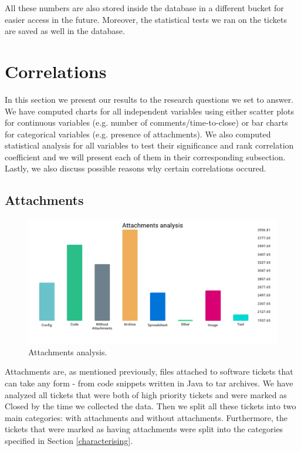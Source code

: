 \documentclass{mpaper}
\begin{document}
All these numbers are also stored inside the database in a different bucket for easier access in the future. Moreover, the statistical 
tests we ran on the tickets are saved as well in the database.

\section{Correlations}\label{correlations}

In this section we present our results to the research questions we set to answer. We have computed charts for all 
independent variables using either scatter plots for continuous variables (e.g. number of comments/time-to-close) 
or bar charts for categorical variables (e.g. presence of attachments). We also computed statistical analysis for 
all variables to test their significance and rank correlation coefficient and we will present each of them in their 
corresponding subsection. Lastly, we also discuss possible reasons why certain correlations occured.

\subsection{Attachments}

\begin{figure}[ht]
  \begin{center}
  \includegraphics[scale=0.23]{images/attachments.png}
  \end{center}
  \caption{\label{attachments}Attachments analysis.}
\end{figure}

Attachments are, as mentioned previously, files attached to software tickets that can take any form - from code 
snippets written in Java to tar archives. We have analyzed all tickets that were both of high priority tickets and
were marked as Closed by the time we collected the data. Then we split all these tickets into two main categories: 
with attachments and without attachments. Furthermore, the tickets that were marked as having attachments were split 
into the categories specified in Section \ref{characterising}. 
\end{document}
